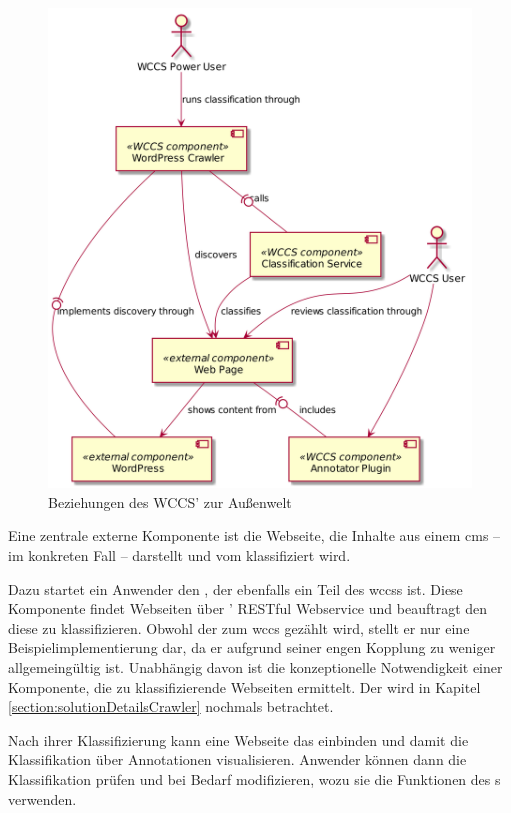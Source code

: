         \begin{figure}
            \centering
            \includegraphics[scale=\imageScalingFactor]{../resources/architecture/external_architecture.png}
            \caption{Beziehungen des WCCS' zur Außenwelt}
            \label{image:wccsExternalArchitecture}
        \end{figure}

        Eine zentrale externe Komponente ist die Webseite,
        die Inhalte aus einem \gls{cms} -- im konkreten Fall {\wordpress} --
        darstellt und vom {\classificationService} klassifiziert wird.
        
        Dazu startet ein Anwender den {\wordpressCrawler}, der ebenfalls ein Teil des \glspl{wccs} ist.
        Diese Komponente findet Webseiten über {\wordpress}' RESTful Webservice und beauftragt den
        {\classificationService} diese zu klassifizieren.
        Obwohl der {\wordpressCrawler} zum \gls{wccs} gezählt wird,
        stellt er nur eine Beispielimplementierung dar,
        da er aufgrund seiner engen Kopplung zu {\wordpress} weniger allgemeingültig ist.
        Unabhängig davon ist die konzeptionelle Notwendigkeit einer Komponente,
        die zu klassifizierende Webseiten ermittelt.
        Der {\wordpressCrawler} wird in Kapitel \ref{section:solutionDetailsCrawler} nochmals betrachtet.

        Nach ihrer Klassifizierung kann eine Webseite das {\annotatorPlugin} einbinden
        und damit die Klassifikation über Annotationen visualisieren.
        Anwender können dann die Klassifikation prüfen und bei Bedarf modifizieren,
        wozu sie die Funktionen des {\annotatorPlugin}s verwenden.
